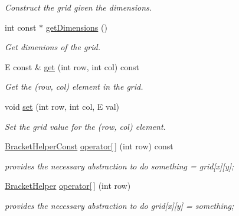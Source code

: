 \begin{DoxyCompactItemize}
\begin{DoxyCompactList}\small\item\em Construct the grid given the dimensions. \end{DoxyCompactList}\item 
int const  $\ast$ \hyperlink{classbridges_1_1datastructure_1_1_grid_a5f1427f96782b3667585c06caef0b533}{get\+Dimensions} ()
\begin{DoxyCompactList}\small\item\em Get dimenions of the grid. \end{DoxyCompactList}\item 
E const  \& \hyperlink{classbridges_1_1datastructure_1_1_grid_a1ff40a322e0c6407affb608366f895b6}{get} (int row, int col) const
\begin{DoxyCompactList}\small\item\em Get the (row, col) element in the grid. \end{DoxyCompactList}\item 
void \hyperlink{classbridges_1_1datastructure_1_1_grid_ac0d4784a31f69d8cf4be38952730cfa8}{set} (int row, int col, E val)
\begin{DoxyCompactList}\small\item\em Set the grid value for the (row, col) element. \end{DoxyCompactList}\item 
\hyperlink{classbridges_1_1datastructure_1_1_grid_1_1_bracket_helper_const}{Bracket\+Helper\+Const} \hyperlink{classbridges_1_1datastructure_1_1_grid_a754a890728b6b268a1ba843da89cb1f6}{operator\mbox{[}$\,$\mbox{]}} (int row) const
\begin{DoxyCompactList}\small\item\em provides the necessary abstraction to do something = grid\mbox{[}x\mbox{]}\mbox{[}y\mbox{]}; \end{DoxyCompactList}\item 
\hyperlink{classbridges_1_1datastructure_1_1_grid_1_1_bracket_helper}{Bracket\+Helper} \hyperlink{classbridges_1_1datastructure_1_1_grid_ae5a7cf159c7918193ba75146660c3c1f}{operator\mbox{[}$\,$\mbox{]}} (int row)
\begin{DoxyCompactList}\small\item\em provides the necessary abstraction to do grid\mbox{[}x\mbox{]}\mbox{[}y\mbox{]} = something; \end{DoxyCompactList}\end{DoxyCompactItemize}
